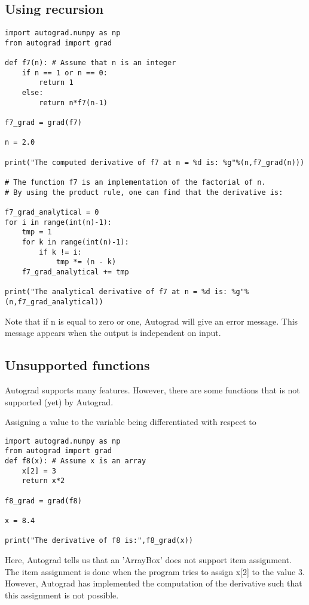 \documentclass[%
oneside,                 %
final,                   %
10pt]{article}
\begin{document}
\subsection*{Using recursion}
\begin{verbatim}
import autograd.numpy as np
from autograd import grad

def f7(n): # Assume that n is an integer
    if n == 1 or n == 0:
        return 1
    else:
        return n*f7(n-1)

f7_grad = grad(f7)

n = 2.0

print("The computed derivative of f7 at n = %d is: %g"%(n,f7_grad(n)))

# The function f7 is an implementation of the factorial of n.
# By using the product rule, one can find that the derivative is:

f7_grad_analytical = 0
for i in range(int(n)-1):
    tmp = 1
    for k in range(int(n)-1):
        if k != i:
            tmp *= (n - k)
    f7_grad_analytical += tmp

print("The analytical derivative of f7 at n = %d is: %g"%(n,f7_grad_analytical))

\end{verbatim}
Note that if n is equal to zero or one, Autograd will give an error message. This message appears when the output is independent on input.

\subsection*{Unsupported functions}
Autograd supports many features. However, there are some functions that is not supported (yet) by Autograd.

Assigning a value to the variable being differentiated with respect to
\begin{verbatim}
import autograd.numpy as np
from autograd import grad
def f8(x): # Assume x is an array
    x[2] = 3
    return x*2

f8_grad = grad(f8)

x = 8.4

print("The derivative of f8 is:",f8_grad(x))
\end{verbatim}
Here, Autograd tells us that an 'ArrayBox' does not support item assignment. The item assignment is done when the program tries to assign x[2] to the value 3. However, Autograd has implemented the computation of the derivative such that this assignment is not possible.
\end{document}
